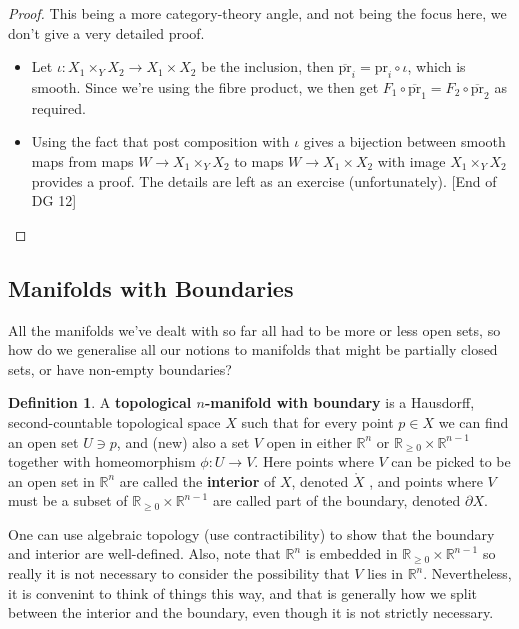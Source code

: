 \documentclass{article}
\theoremstyle{definition}
\newtheorem{definition}{Definition}
\begin{document}
\begin{proof}
  This being a more category-theory angle, and not being the focus here, we
  don't give a very detailed proof.
  \begin{itemize}
    \item Let $\iota : X_1 \times_Y X_2 \to X_1 \times X_2$ be the inclusion,
      then $\overline{\text{pr}}_i = \text{pr}_i \circ \iota$, which is smooth.
      Since we're using the fibre product, we then get $F_1 \circ
      \overline{\text{pr}}_1 = F_2 \circ \overline{\text{pr}}_2$ as required.
    \item Using the fact that post composition with $\iota$ gives a bijection
      between smooth maps from maps $W \to X_1 \times_Y X_2$ to maps $W \to X_1
      \times X_2$ with image $X_1 \times_Y X_2$ provides a proof. The details
      are left as an exercise (unfortunately). [End of DG 12]
  \end{itemize}
\end{proof}

\subsection{Manifolds with Boundaries}

All the manifolds we've dealt with so far all had to be more or less open sets,
so how do we generalise all our notions to manifolds that might be partially
closed sets, or have non-empty boundaries?

\begin{definition}
A \textbf{topological $n$-manifold with boundary} is a Hausdorff,
second-countable topological space $X$ such that for every point $p \in X$ we
can find an open set $U \ni p$, and (new) also a set $V$ open in either
$\mathbb{R}^n$ or $\mathbb{R}_{\geq 0} \times \mathbb{R}^{n - 1}$ together with
homeomorphism $\phi : U \to V$. Here points where $V$ can be picked to be an open
set in $\mathbb{R}^n$ are called the \textbf{interior} of $X$, denoted
$\mathring{X}$ , and points where $V$ must be a subset of $\mathbb{R}_{\geq 0}
\times \mathbb{R}^{n - 1}$ are called part of the boundary, denoted $\partial X$.
\end{definition}

One can use algebraic topology (use contractibility) to show that the boundary
and interior are well-defined. Also, note that $\mathbb{R}^n$ is embedded in
$\mathbb{R}_{\geq 0} \times \mathbb{R}^{n - 1}$ so really it is not necessary to
consider the possibility that $V$ lies in $\mathbb{R}^n$. Nevertheless, it is
convenint to think of things this way, and that is generally how we split
between the interior and the boundary, even though it is not strictly necessary.
\end{document}
